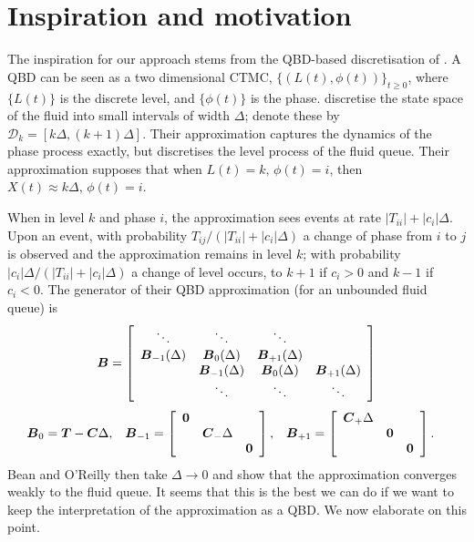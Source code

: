 \section{Inspiration and motivation}\label{sec: inspiration}
The inspiration for our approach stems from the QBD-based discretisation of \cite{bo2013}. A QBD can be seen as a two dimensional CTMC, \(\{(L(t),\phi(t))\}_{t\geq 0}\), where \(\{L(t)\}\) is the discrete level, and \(\{\phi(t)\}\) is the phase. \cite{bo2013} discretise the state space of the fluid into small intervals of width \(\Delta\); denote these by \(\mathcal D_k=[k\Delta,(k+1)\Delta]\). Their approximation captures the dynamics of the phase process exactly, but discretises the level process of the fluid queue. Their approximation supposes that when \(L(t)=k,\,\phi(t)=i\), then \(X(t)\approx k\Delta,\,\phi(t)=i\). 

When in level \(k\) and phase \(i\), the approximation sees events at rate \(|T_{ii}| + |c_i|\Delta\). Upon an event, with probability \(T_{ij}/(|T_{ii}| + |c_i|\Delta)\) a change of phase from \(i\) to \(j\) is observed and the approximation remains in level \(k\); with probability \(|c_i|\Delta/(|T_{ii}| + |c_i|\Delta)\) a change of level occurs, to \(k+1\) if \(c_i>0\) and \(k-1\) if \(c_i<0\). The generator of their QBD approximation (for an unbounded fluid queue) is 
\[\boldsymbol B = \left[ \begin{array}{cccc} \ddots & \ddots & \ddots & \\ \boldsymbol B_{-1}(\Delta) & \boldsymbol B_0(\Delta) & \boldsymbol B_{+1}(\Delta) & \\  & \boldsymbol B_{-1}(\Delta) & \boldsymbol B_0(\Delta) & \boldsymbol B_{+1}(\Delta) \\ & \ddots & \ddots & \ddots \end{array} \right]\]
\begin{align}
\boldsymbol B_0 &= \boldsymbol T- \boldsymbol C\Delta, && \boldsymbol B_{-1} = \left[\begin{array}{ccc} \boldsymbol 0 & & \\ & \boldsymbol C_-\Delta & \\ & & \boldsymbol 0 \end{array}\right], && \boldsymbol B_{+1} = \left[\begin{array}{ccc} \boldsymbol C_+\Delta & & \\ & \boldsymbol 0 & \\ & & \boldsymbol 0\end{array}\right].
\end{align}
Bean and O'Reilly then take \(\Delta \to 0\) and show that the approximation converges weakly to the fluid queue. It seems that this is the best we can do if we want to keep the interpretation of the approximation as a QBD. We now elaborate on this point.

